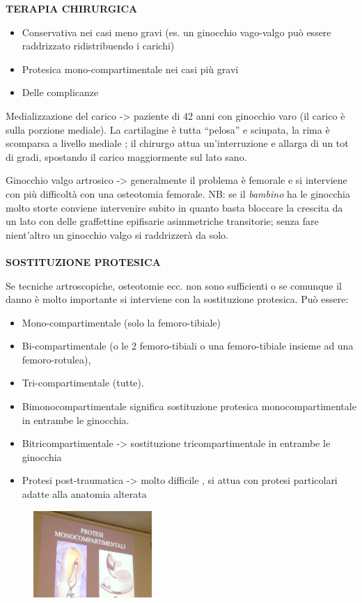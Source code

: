 \textbf{TERAPIA CHIRURGICA }

\begin{itemize}
\item
  Conservativa nei casi meno gravi (es. un ginocchio vago-valgo può essere raddrizzato ridistribuendo i carichi)
\item
  Protesica mono-compartimentale nei casi più gravi
\item
  Delle complicanze
\end{itemize}

Medializzazione del carico -> paziente di 42 anni con ginocchio varo (il carico è sulla porzione mediale). La cartilagine è tutta ``pelosa'' e sciupata, la rima è scomparsa a livello mediale ; il chirurgo attua un'interruzione e allarga di un tot di gradi, spostando il carico maggiormente sul lato sano.

Ginocchio valgo artrosico -> generalmente il problema è femorale e si interviene con più difficoltà con una osteotomia femorale. NB: se il \emph{bambino} ha le ginocchia molto storte conviene intervenire subito in quanto basta bloccare la crescita da un lato con delle graffettine epifisarie asimmetriche transitorie; senza fare nient'altro un ginocchio valgo si raddrizzerà da solo.
\\\\
\textbf{SOSTITUZIONE PROTESICA }

Se tecniche artroscopiche, osteotomie ecc. non sono sufficienti o se
comunque il danno è molto importante si interviene con la sostituzione
protesica. Può essere:

\begin{itemize}
\item
  Mono-compartimentale (solo la femoro-tibiale)
\item
  Bi-compartimentale (o le 2 femoro-tibiali o una femoro-tibiale insieme ad una femoro-rotulea),
\item
  Tri-compartimentale (tutte).
\item
  Bimonocompartimentale significa sostituzione protesica monocompartimentale in entrambe le ginocchia.
\item
  Bitricompartimentale -> sostituzione tricompartimentale in entrambe le ginocchia
\item
  Protesi post-traumatica -> molto difficile , si attua con protesi particolari adatte alla anatomia alterata
\end{itemize}

\begin{figure}[!ht]
\centering
\includegraphics[width=0.4\textwidth]{009/image22.png}
\end{figure}

